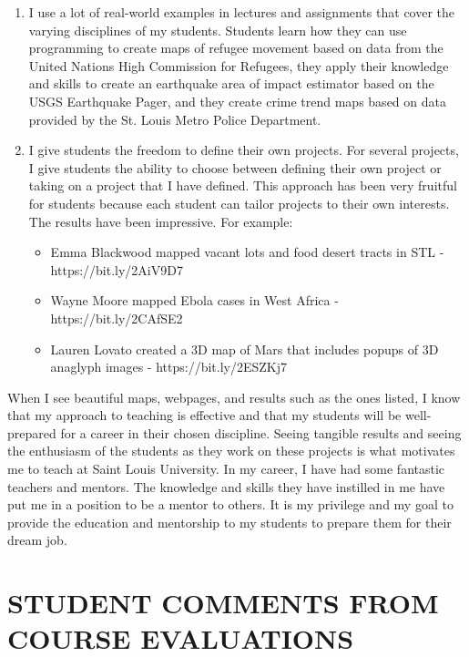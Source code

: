 \documentclass{res}
\begin{document}
\begin{resume}
\begin{enumerate}
\item I use a lot of real-world examples in lectures and assignments that cover the varying disciplines of my students. Students learn how they can use programming to create maps of refugee movement based on data from the United Nations High Commission for Refugees, they apply their knowledge and skills to create an earthquake area of impact estimator based on the USGS Earthquake Pager, and they create crime trend maps based on data provided by the St. Louis Metro Police Department.
\item I give students the freedom to define their own projects. For several projects, I give students the ability to choose between defining their own project or taking on a project that I have defined. This approach has been very fruitful for students because each student can tailor projects to their own interests. The results have been impressive. For example:
\begin{itemize}  
\item Emma Blackwood mapped vacant lots and food desert tracts in STL - 
https://bit.ly/2AiV9D7 
\item Wayne Moore mapped Ebola cases in West Africa - https://bit.ly/2CAfSE2 
\item Lauren Lovato created a 3D map of Mars that includes popups of 3D anaglyph images - https://bit.ly/2ESZKj7
\end{itemize}
\end{enumerate}
\par When I see beautiful maps, webpages, and results such as the ones listed, I know that my approach to teaching is effective and that my students will be well-prepared for a career in their chosen discipline. Seeing tangible results and seeing the enthusiasm of the students as they work on these projects is what motivates me to teach at Saint Louis University. In my career, I have had some fantastic teachers and mentors. The knowledge and skills they have instilled in me have put me in a position to be a mentor to others. It is my privilege and my goal to provide the education and mentorship to my students to prepare them for their dream job.
 
 
\section{STUDENT COMMENTS FROM COURSE EVALUATIONS}
   \vspace{-0.1in}	


\end{resume}
\end{document}
